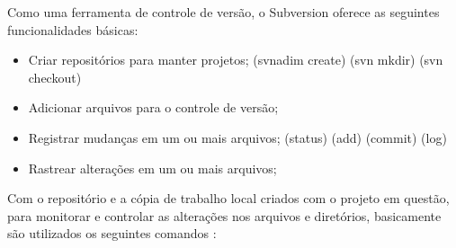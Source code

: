 Como uma ferramenta de controle de versão, o Subversion oferece as seguintes funcionalidades básicas: 

\begin{itemize}
 \item Criar repositórios para manter projetos; (svnadim create) (svn mkdir) (svn checkout)
 \item Adicionar arquivos para o controle de versão; 
 \item Registrar mudanças em um ou mais arquivos; (status) (add) (commit) (log)
 \item Rastrear alterações em um ou mais arquivos;
\end{itemize}

Com o repositório e a cópia de trabalho local criados com o projeto em questão, para monitorar e controlar as
alterações nos arquivos e diretórios, basicamente são utilizados os seguintes comandos \cite{svn-book}:

